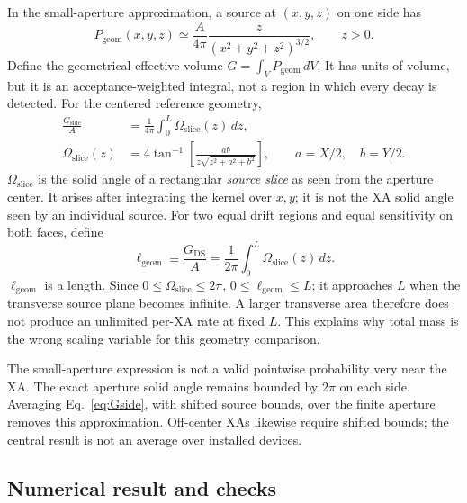 \documentclass[11pt]{article}
\begin{document}
In the small-aperture approximation, a source at $(x,y,z)$ on one side has
\begin{equation}
P_{\mathrm{geom}}(x,y,z)
\simeq \frac{A}{4\pi}\frac{z}{(x^2+y^2+z^2)^{3/2}},
\qquad z>0.
\end{equation}
Define the geometrical effective volume $G=\int_V P_{\mathrm{geom}}\,dV$.
It has units of volume, but it is an acceptance-weighted integral, not a
region in which every decay is detected. For the centered reference geometry,
\begin{align}
\frac{G_{\mathrm{side}}}{A}
&=\frac{1}{4\pi}\int_0^L\Omega_{\mathrm{slice}}(z)\,dz,
\label{eq:Gside}\\
\Omega_{\mathrm{slice}}(z)
&=4\tan^{-1}\!\left[
\frac{ab}{z\sqrt{z^2+a^2+b^2}}\right],
\qquad a=X/2,\quad b=Y/2.
\end{align}
$\Omega_{\mathrm{slice}}$ is the solid angle of a rectangular \emph{source
slice} as seen from the aperture center. It arises after integrating the
kernel over $x,y$; it is not the XA solid angle seen by an individual source.
For two equal drift regions and equal sensitivity on both faces, define
\begin{equation}
\boxed{\ell_{\mathrm{geom}}\equiv\frac{G_{\mathrm{DS}}}{A}
=\frac{1}{2\pi}\int_0^L\Omega_{\mathrm{slice}}(z)\,dz.}
\label{eq:ell}
\end{equation}
$\ell_{\mathrm{geom}}$ is a length. Since $0\leq\Omega_{\mathrm{slice}}\leq2\pi$,
$0\leq\ell_{\mathrm{geom}}\leq L$; it approaches $L$ when the transverse source
plane becomes infinite. A larger transverse area therefore does not produce
an unlimited per-XA rate at fixed $L$. This explains why total mass is the
wrong scaling variable for this geometry comparison.

The small-aperture expression is not a valid pointwise probability very near
the XA. The exact aperture solid angle remains bounded by $2\pi$ on each
side. Averaging Eq.~\eqref{eq:Gside}, with shifted source bounds, over the
finite aperture removes this approximation. Off-center XAs likewise require
shifted bounds; the central result is not an average over installed devices.

\subsection{Numerical result and checks}
\end{document}
